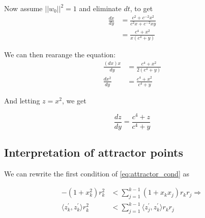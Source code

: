 Now assume $||w_0||^2 = 1$ and eliminate $dt$, to get
\begin{equation}
  \begin{aligned}
  \frac{dx}{dy} &= \frac{c^2 + c^{-2}x^2}{c^2x + c^{-2} x y}\\
                &= \frac{c^4 + x^2}{x (c^4 + y)}
  \end{aligned}
\end{equation}

We can then rearange the equation:
\begin{equation}
  \begin{aligned}
  \frac{(dx) x}{dy} &= \frac{c^4 + x^2}{2(c^4 + y)}\\
  \frac{dx^2}{dy} &= \frac{c^4 + x^2}{c^4 + y}
  \end{aligned}
\end{equation}

And letting $z = x^2$, we get

\begin{equation}
    \frac{dz}{dy} = \frac{c^4 + z}{c^4 + y} 
\end{equation}



\subsection{Interpretation of attractor points}
We can rewrite the first condition of \eqref{eq:attractor_cond} as 

\begin{equation}
\begin{aligned}\label{eq:attractor_cond_interp}
    -(1 + x_k^2) r_k^2 &< \sum_{j=1}^{k-1} (1 + x_k x_j) r_k r_j \Rightarrow\\
    \langle z^\prime_k, z^\prime_k \rangle r_k^2 &< \sum_{j=1}^{k-1} \langle z^\prime_j, z^\prime_k \rangle r_k r_j
\end{aligned}
\end{equation}

